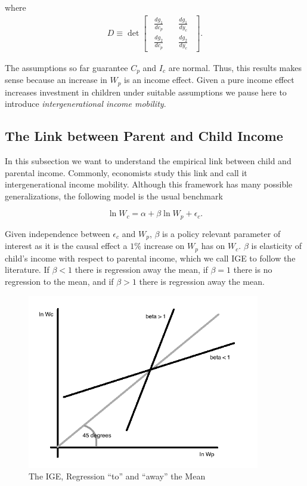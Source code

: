 \noindent where 
\begin{align}
D \equiv \det \begin{bmatrix}
                    \ \ \frac{dg_1}{dc_p} \quad &\frac{dg_1}{dy_c}\ \ \\
                    \ \ \frac{dg_2}{dc_p} \quad &\frac{dg_2}{dy_c}\ \
                  \end{bmatrix}.
\end{align}

\noindent The assumptions so far guarantee $C_{p}$ and $I_{c}$ are normal. Thus, this results makes sense because an increase in $W_{p}$ is an income effect. Given a pure income effect increases investment in children under suitable assumptions we pause here to introduce \textit{intergenerational income mobility}. 

\subsection{The Link between Parent and Child Income}
In this subsection we want to understand the empirical link between child and parental income. Commonly, economists study this link and call it intergenerational income mobility. Although this framework has many possible generalizations, the following model is the usual benchmark

\begin{equation}
\ln W_{c} = \alpha + \beta \ln W_{p} + \epsilon_{c}. \label{eq:ige}
\end{equation}

\noindent Given independence between $\epsilon_{c}$ and $W_{p}$, $\beta$ is a policy relevant parameter of interest as it is the causal effect a $1 \%$ increase on $W_{p}$ has on $W_{c}$. $\beta$ is elasticity of child's income with respect to parental income, which we call IGE to follow the literature. If $\beta < 1$ there is regression away the mean, if $\beta = 1 $ there is no regression to the mean, and if $\beta > 1$ there is regression away the mean. 

\begin{center}
\begin{figure}[H] 
\caption{The IGE, Regression ``to'' and ``away'' the Mean}
\centering
\includegraphics[width=4in, height=3in]{Plots/IGE.png}
\end{figure}
\end{center}

